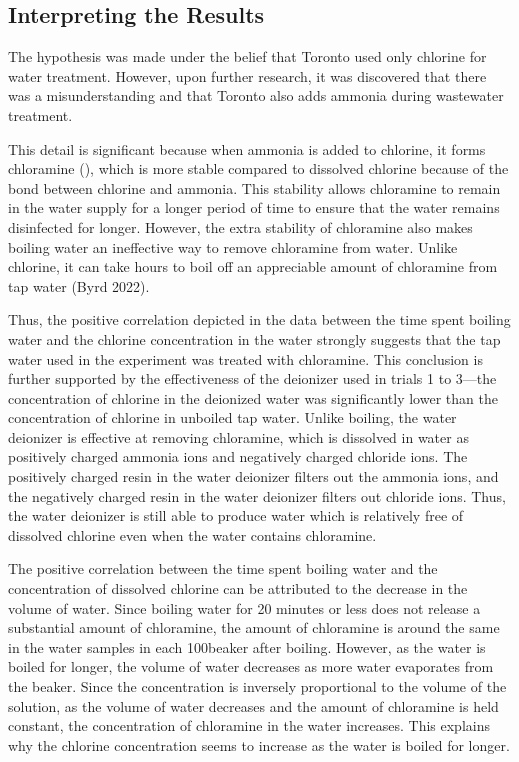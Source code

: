 \documentclass[11pt]{article}
\begin{document}
\subsection{Interpreting the Results}

The hypothesis was made under the belief that Toronto used only chlorine for water treatment. However, upon further research, it was discovered that there was a misunderstanding and that Toronto also adds ammonia during wastewater treatment.

This detail is significant because when ammonia is added to chlorine, it forms chloramine (), which is more stable compared to dissolved chlorine because of the bond between chlorine and ammonia. This stability allows chloramine to remain in the water supply for a longer period of time to ensure that the water remains disinfected for longer. However, the extra stability of chloramine also makes boiling water an ineffective way to remove chloramine from water. Unlike chlorine, it can take hours to boil off an appreciable amount of chloramine from tap water (Byrd 2022).

Thus, the positive correlation depicted in the data between the time spent boiling water and the chlorine concentration in the water strongly suggests that the tap water used in the experiment was treated with chloramine. This conclusion is further supported by the effectiveness of the deionizer used in trials 1 to 3—the concentration of chlorine in the deionized water was significantly lower than the concentration of chlorine in unboiled tap water. Unlike boiling, the water deionizer is effective at removing chloramine, which is dissolved in water as positively charged ammonia ions and negatively charged chloride ions. The positively charged resin in the water deionizer filters out the ammonia ions, and the negatively charged resin in the water deionizer filters out chloride ions. Thus, the water deionizer is still able to produce water which is relatively free of dissolved chlorine even when the water contains chloramine.

The positive correlation between the time spent boiling water and the concentration of dissolved chlorine can be attributed to the decrease in the volume of water. Since boiling water for 20 minutes or less does not release a substantial amount of chloramine, the amount of chloramine is around the same in the water samples in each 100\ml beaker after boiling. However, as the water is boiled for longer, the volume of water decreases as more water evaporates from the beaker. Since the concentration is inversely proportional to the volume of the solution, as the volume of water decreases and the amount of chloramine is held constant, the concentration of chloramine in the water increases. This explains why the chlorine concentration seems to increase as the water is boiled for longer.
\end{document}
